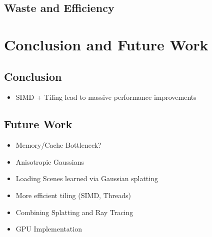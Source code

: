\documentclass[a4paper, 11pt]{memoir}
\begin{document}
    \section{Waste and Efficiency}

    \chapter{Conclusion and Future Work}
    \section{Conclusion}
    \begin{itemize}
        \item SIMD + Tiling lead to massive performance improvements
    \end{itemize}

    \section{Future Work}
    \begin{itemize}
        \item Memory/Cache Bottleneck?
        \item Anisotropic Gaussians
        \item Loading Scenes learned via Gaussian splatting
        \item More efficient tiling (SIMD, Threads)
        \item Combining Splatting and Ray Tracing
        \item GPU Implementation
    \end{itemize}

    \appendix
\end{document}
